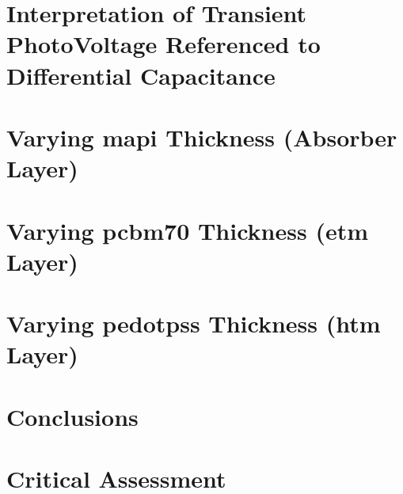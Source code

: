 \section{Interpretation of Transient PhotoVoltage Referenced to Differential Capacitance}\label{interpretation_tpvdc}


\section{Varying \gls{mapi} Thickness (Absorber Layer)}


\section{Varying \gls{pcbm70} Thickness (\gls{etm} Layer)}
\section{Varying \gls{pedotpss} Thickness (\gls{htm} Layer)}
\section{Conclusions}
\section{Critical Assessment}